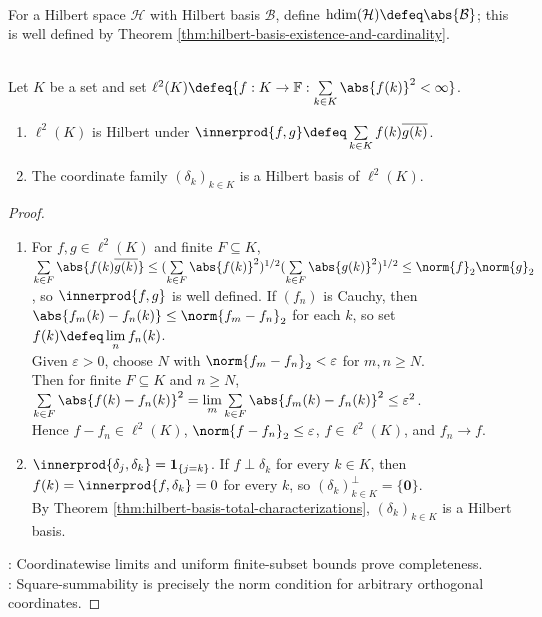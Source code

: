 \begin{definition} \label{def:hilbert-dimension} \\
For a Hilbert space $\mathcal{H}$ with Hilbert basis $\mathcal{B}$, define $\operatorname{hdim}(\mathcal{H})\defeq\abs{\mathcal{B}}$; this is well defined by Theorem \ref{thm:hilbert-basis-existence-and-cardinality}.
\end{definition}

\begin{proposition} \label{prop:l2-arbitrary-index-hilbert-model} \\
Let $K$ be a set and set $\ell^2(K)\defeq\{f:K\to\mathbb{F}:\sum\limits_{k\in K}\abs{f(k)}^2<\infty\}$.
\begin{enumerate}[label=(\roman*)]
\setlength{\itemsep}{0pt}
\item $\ell^2(K)$ is Hilbert under $\innerprod{f,g}\defeq\sum\limits_{k\in K}f(k)\overline{g(k)}$.
\item The coordinate family $(\delta_k)_{k\in K}$ is a Hilbert basis of $\ell^2(K)$.
\end{enumerate}
\begin{proof}
\begin{enumerate}[label=(\roman*)]
\setlength{\itemsep}{0pt}
\item For $f,g\in\ell^2(K)$ and finite $F\subseteq K$, $\sum\limits_{k\in F}\abs{f(k)\overline{g(k)}}\leq(\sum\limits_{k\in F}\abs{f(k)}^2)^{1/2}(\sum\limits_{k\in F}\abs{g(k)}^2)^{1/2}\leq\norm{f}_2\norm{g}_2$, so $\innerprod{f,g}$ is well defined. If $(f_n)$ is Cauchy, then $\abs{f_m(k)-f_n(k)}\leq\norm{f_m-f_n}_2$ for each $k$, so set $f(k)\defeq\lim\limits_nf_n(k)$.\\
Given $\varepsilon>0$, choose $N$ with $\norm{f_m-f_n}_2<\varepsilon$ for $m,n\geq N$.\\
Then for finite $F\subseteq K$ and $n\geq N$, $\sum\limits_{k\in F}\abs{f(k)-f_n(k)}^2=\lim\limits_m\sum\limits_{k\in F}\abs{f_m(k)-f_n(k)}^2\leq\varepsilon^2$.\\
Hence $f-f_n\in\ell^2(K)$, $\norm{f-f_n}_2\leq\varepsilon$, $f\in\ell^2(K)$, and $f_n\to f$.
\item $\innerprod{\delta_j,\delta_k}=\mathbf1_{\{j=k\}}$. If $f\perp\delta_k$ for every $k\in K$, then $f(k)=\innerprod{f,\delta_k}=0$ for every $k$, so $(\delta_k)_{k\in K}^{\perp}=\{\mathbf0\}$.\\
By Theorem \ref{thm:hilbert-basis-total-characterizations}, $(\delta_k)_{k\in K}$ is a Hilbert basis.
\end{enumerate}
: Coordinatewise limits and uniform finite-subset bounds prove completeness.\\
: Square-summability is precisely the norm condition for arbitrary orthogonal coordinates.
\end{proof}
\end{proposition}

